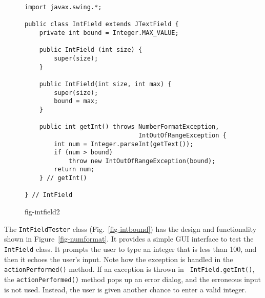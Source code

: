 \begin{figure}[tb]
\jjjprogstart
\begin{jjjlisting}
\begin{lstlisting}
import javax.swing.*;

public class IntField extends JTextField {
    private int bound = Integer.MAX_VALUE;

    public IntField (int size) {
        super(size);
    }

    public IntField(int size, int max) {
        super(size);
        bound = max;
    }

    public int getInt() throws NumberFormatException, 
                               IntOutOfRangeException {
        int num = Integer.parseInt(getText());
        if (num > bound)
            throw new IntOutOfRangeException(bound);
        return num;
    } // getInt()

} // IntField
\end{lstlisting}
\end{jjjlisting}
{fig-intfield2}
\end{figure}


The {\tt IntFieldTester} class (Fig.~\ref{fig-intbound}) has the
design and functionality shown in Figure~\ref{fig-numformat}. It provides
a simple GUI interface to test the {\tt IntField} class.  It prompts
the user to type an integer that is less than 100, and then it
echoes the user's input.  Note how the exception is handled in the
{\tt actionPerformed()} method.  If an exception is thrown in {\tt
IntField.getInt()}, the {\tt actionPerformed()} method pops up an
error dialog, and the erroneous input is not used.  Instead, the user is
given another chance to enter a valid integer.


